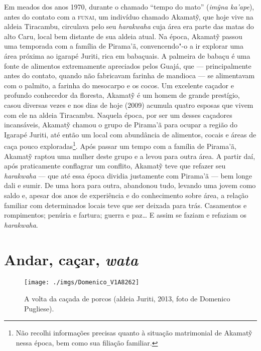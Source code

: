 \forceindent Em meados dos anos 1970, durante o chamado ``tempo do mato'' (\emph{imỹna
ka'ape}), antes do contato com a \textsc{funai}, um indivíduo chamado Akamatỹ,
que hoje vive na aldeia Tiracambu, circulava pelo seu \emph{harakwaha}
cuja área era parte das matas do alto Caru, local bem distante de sua
aldeia atual. Na época, Akamatỹ passou uma temporada com a família de
Pirama'ã, convencendo"-o a ir explorar uma área próxima ao igarapé
Juriti, rica em babaçuais. A palmeira de babaçu é uma fonte de alimentos
extremamente apreciados pelos Guajá, que --- principalmente antes do
contato, quando não fabricavam farinha de mandioca --- se alimentavam com
o palmito, a farinha do mesocarpo e os cocos. Um excelente caçador e
profundo conhecedor da floresta, Akamatỹ é um homem de grande prestígio,
casou diversas vezes e nos dias de hoje (2009) acumula quatro esposas
que vivem com ele na aldeia Tiracambu. Naquela época, por ser um desses
caçadores incansáveis, Akamatỹ chamou o grupo de Pirama'ã para ocupar a
região do Igarapé Juriti, até então um local com abundância de
alimentos, cocais e áreas de caça pouco exploradas\footnote{Não recolhi
  informações precisas quanto à situação matrimonial de Akamatỹ nessa
  época, bem como sua filiação familiar.}. Após passar um tempo com a
família de Pirama'ã, Akamatỹ raptou uma mulher deste grupo e a levou
para outra área. A partir daí, após praticamente conflagrar um conflito,
Akamatỹ teve que refazer seu \emph{harakwaha} --- que até essa época
dividia justamente com Pirama'ã --- bem longe dali e sumir. De uma hora
para outra, abandonou tudo, levando uma jovem como saldo e, apesar dos
anos de experiência e do conhecimento sobre área, a relação familiar com
determinados locais teve que ser deixada para trás. Casamentos e
rompimentos; penúria e fartura; guerra e paz\ldots{} E assim se faziam e
refaziam os \emph{harakwaha}.

\section{Andar, caçar, \emph{wata}}

\begin{figure}[H]
\centering
  \texttt{[image: ./imgs/Domenico\_V1A8262]}
\caption{A volta da caçada de porcos (aldeia Juriti, 2013, foto de Domenico Pugliese).}
\end{figure}


